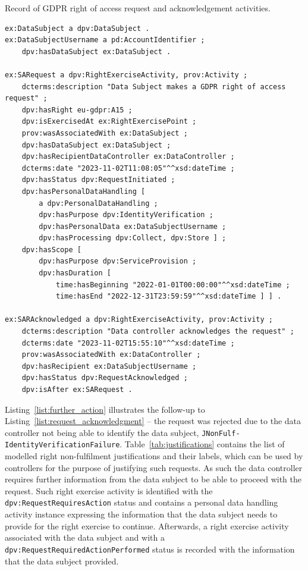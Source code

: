 \begin{listing}[htp]
\caption{Record of GDPR right of access request and acknowledgement activities.}
\label{list:request_acknowledgment}
\begin{verbatim}
ex:DataSubject a dpv:DataSubject .
ex:DataSubjectUsername a pd:AccountIdentifier ;
    dpv:hasDataSubject ex:DataSubject .

ex:SARequest a dpv:RightExerciseActivity, prov:Activity ;
    dcterms:description "Data Subject makes a GDPR right of access request" ;
    dpv:hasRight eu-gdpr:A15 ;
    dpv:isExercisedAt ex:RightExercisePoint ;
    prov:wasAssociatedWith ex:DataSubject ;
    dpv:hasDataSubject ex:DataSubject ;
    dpv:hasRecipientDataController ex:DataController ;
    dcterms:date "2023-11-02T11:08:05"^^xsd:dateTime ;
    dpv:hasStatus dpv:RequestInitiated ;
    dpv:hasPersonalDataHandling [
        a dpv:PersonalDataHandling ;
        dpv:hasPurpose dpv:IdentityVerification ;
        dpv:hasPersonalData ex:DataSubjectUsername ;
        dpv:hasProcessing dpv:Collect, dpv:Store ] ;
    dpv:hasScope [
        dpv:hasPurpose dpv:ServiceProvision ;
        dpv:hasDuration [
            time:hasBeginning "2022-01-01T00:00:00"^^xsd:dateTime ;
            time:hasEnd "2022-12-31T23:59:59"^^xsd:dateTime ] ] .

ex:SARAcknowledged a dpv:RightExerciseActivity, prov:Activity ;
    dcterms:description "Data controller acknowledges the request" ;
    dcterms:date "2023-11-02T15:55:10"^^xsd:dateTime ;
    prov:wasAssociatedWith ex:DataController ;
    dpv:hasRecipient ex:DataSubjectUsername ;
    dpv:hasStatus dpv:RequestAcknowledged ;
    dpv:isAfter ex:SARequest .
\end{verbatim}
\end{listing}

Listing~\ref{list:further_action} illustrates the follow-up to Listing~\ref{list:request_acknowledgment} -- the request was rejected due to the data controller not being able to identify the data subject, \texttt{JNonFulf-IdentityVerificationFailure}.
Table~\ref{tab:justifications} contains the list of modelled right non-fulfilment justifications and their labels, which can be used by controllers for the purpose of justifying such requests.
As such the data controller requires further information from the data subject to be able to proceed with the request.
Such right exercise activity is identified with the \texttt{dpv:RequestRequiresAction} status and contains a personal data handling activity instance expressing the information that the data subject needs to provide for the right exercise to continue.
Afterwards, a right exercise activity associated with the data subject and with a \texttt{dpv:RequestRequiredActionPerformed} status is recorded with the information that the data subject provided.

